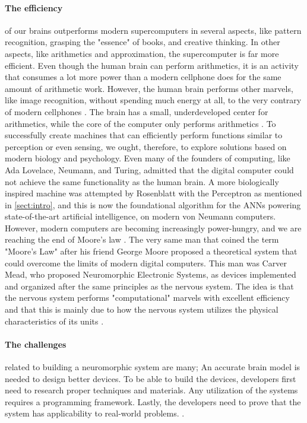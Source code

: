 \paragraph{The efficiency} of our brains outperforms modern supercomputers in several aspects, like pattern recognition, grasping the "essence" of books, and creative thinking.
In other aspects, like arithmetics and approximation, the supercomputer is far more efficient.
Even though the human brain can perform arithmetics, it is an activity that consumes a lot more power than a modern cellphone does for the same amount of arithmetic work. However, the human brain performs other marvels, like image recognition, without spending much energy at all, to the very contrary of modern cellphones \cite{meier_special_2017}. The brain has a small, underdeveloped center for arithmetics, while the core of the computer only performs arithmetics \cite{dehaene_arithmetic_2004}.
To successfully create machines that can efficiently perform functions similar to perception or even sensing, we ought, therefore, to explore solutions based on modern biology and psychology.
Even many of the founders of computing, like Ada Lovelace, Neumann, and Turing, admitted that the digital computer could not achieve the same functionality as the human brain.
A more biologically inspired machine was attempted by Rosenblatt with the Perceptron as mentioned in \vref{sect:intro}, and this is now the foundational algorithm for the ANNs powering state-of-the-art artificial intelligence, on modern von Neumann computers.
However, modern computers are becoming increasingly power-hungry, and we are reaching the end of Moore's law \cite{mead_neuromorphic_1990} \cite{moore_cramming_1998}.
The very same man that coined the term "Moore's Law" after his friend George Moore proposed a theoretical system that could overcome the limits of modern digital computers.
This man was Carver Mead, who proposed Neuromorphic Electronic Systems, as devices implemented and organized after the same principles as the nervous system.
The idea is that the nervous system performs "computational" marvels with excellent efficiency and that this is mainly due to how the nervous system utilizes the physical characteristics of its units \cite{mead_neuromorphic_1990}.

\paragraph{The challenges} related to building a neuromorphic system are many;
An accurate brain model is needed to design better devices.
To be able to build the devices, developers first need to research proper techniques and materials.
Any utilization of the systems requires a programming framework.
Lastly, the developers need to prove that the system has applicability to real-world problems.
\cite{schuman_survey_2017}.

